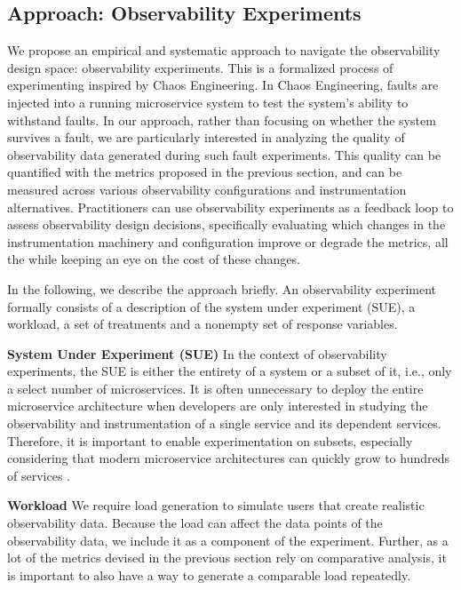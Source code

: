 \subsection{Approach: Observability Experiments}\label{sec:experiments}
We propose an empirical and systematic approach to navigate the observability design space: observability experiments. %
This is a formalized process of experimenting inspired by Chaos Engineering. In Chaos Engineering, faults are injected into a running microservice system to test the system's ability to withstand faults. In our approach, rather than focusing on whether the system survives a fault, we are particularly interested in analyzing the %
quality of observability data generated during such fault experiments. This quality can be quantified with the metrics proposed in the previous section, and can be measured across various observability configurations and instrumentation alternatives. 
Practitioners can use observability experiments as a feedback loop to assess observability design decisions, specifically evaluating which changes in the instrumentation machinery and configuration improve or degrade the metrics, all the while keeping an eye on the cost of these changes.

In the following, we describe the approach briefly. An observability experiment formally consists of a description of the system under experiment (SUE), a workload, a set of treatments and a nonempty set of response variables.

\textbf{System Under Experiment (SUE)} In the context of observability experiments, the SUE is either the entirety of a system or a subset of it, i.e., only a select number of microservices. It is often unnecessary to deploy the entire microservice architecture when developers are only interested in studying the observability and instrumentation of a single service and its dependent services. Therefore, it is important to enable experimentation on subsets, especially considering that modern microservice architectures can quickly grow to hundreds of services \cite{Li_ObservabilityIndustrialSurvey_2022}.

\textbf{Workload} We require load generation to simulate users that create realistic observability data. Because the load can affect the data points of the observability data, we include it as a component of the experiment. Further, as a lot of the metrics devised in the previous section rely on comparative analysis, it is important to also have a way to generate a comparable load repeatedly.

